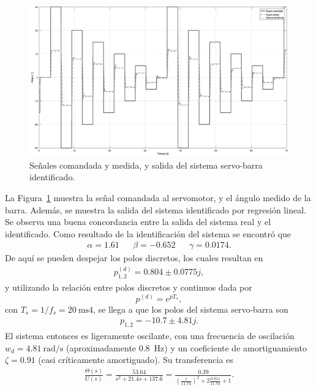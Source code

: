 \begin{figure}[!htbp]
    \centering
    \includegraphics[width=\linewidth]{img/ident-barra.eps}
    \caption{Señales comandada y medida, y salida del sistema servo-barra identificado.}
    \label{fig:ident-barra}
\end{figure}

La Figura~\ref{fig:ident-barra} muestra la señal comandada al servomotor, y el ángulo medido de la barra. Además, se muestra la salida del sistema identificado por regresión lineal. Se observa una buena concordancia entre la salida del sistema real y el identificado. Como resultado de la identificación del sistema se encontró que
\begin{align*}
    \alpha = 1.61 && \beta = -0.652 && \gamma = 0.0174.
\end{align*}
De aquí se pueden despejar los polos discretos, los cuales resultan en
\begin{align*}
    p_{1,2}^{(d)} = 0.804 \pm 0.0775j,
\end{align*}
y utilizando la relación entre polos discretos y continuos dada por
\[
    p^{(d)} = e^{p T_s},
\]
con $T_s = 1/f_s = \qty{20}{\ms}4$, se llega a que los polos del sistema servo-barra son
\begin{align*}
    p_{1,2} = -10.7 \pm 4.81j.
\end{align*}
El sistema entonces es ligeramente oscilante, con una frecuencia de oscilación $w_d = \qty{4.81}{\radian\per\s}$ (aproximadamente \qty{0.8}{\Hz}) y un coeficiente de amortiguamiento $\zeta = 0.91$ (casi críticamente amortiguado). Su transferencia es
\begin{align*}
    \frac{\Theta(s)}{U(s)} = \frac{53.64}{s^2 + 21.4 s + 137.6}
    = \frac{0.39}{\left(\frac{s}{11.73}\right)^2 + 2 \frac{0.91 s}{11.73} + 1}.
\end{align*}


